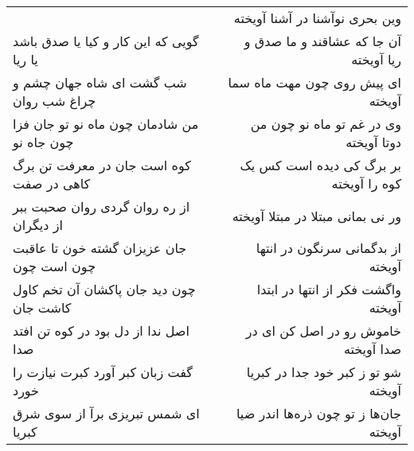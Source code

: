 \begin{center}
\begin{longtable}{l p{0.5cm} r}
&&
وین بحری نوآشنا در آشنا آویخته
\\
گویی که این کار و کیا یا صدق باشد یا ریا
&&
آن جا که عشاقند و ما صدق و ریا آویخته
\\
شب گشت ای شاه جهان چشم و چراغ شب روان
&&
ای پیش روی چون مهت ماه سما آویخته
\\
من شادمان چون ماه نو تو جان فزا چون جاه نو
&&
وی در غم تو ماه نو چون من دوتا آویخته
\\
کوه است جان در معرفت تن برگ کاهی در صفت
&&
بر برگ کی دیده است کس یک کوه را آویخته
\\
از ره روان گردی روان صحبت ببر از دیگران
&&
ور نی بمانی مبتلا در مبتلا آویخته
\\
جان عزیزان گشته خون تا عاقبت چون است چون
&&
از بدگمانی سرنگون در انتها آویخته
\\
چون دید جان پاکشان آن تخم کاول کاشت جان
&&
واگشت فکر از انتها در ابتدا آویخته
\\
اصل ندا از دل بود در کوه تن افتد صدا
&&
خاموش رو در اصل کن ای در صدا آویخته
\\
گفت زبان کبر آورد کبرت نیازت را خورد
&&
شو تو ز کبر خود جدا در کبریا آویخته
\\
ای شمس تبریزی برآ از سوی شرق کبریا
&&
جان‌ها ز تو چون ذره‌ها اندر ضیا آویخته
\\
\end{longtable}
\end{center}
